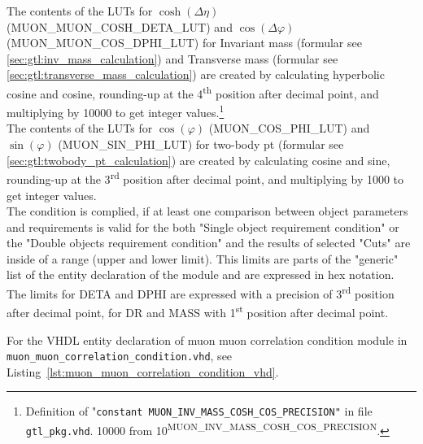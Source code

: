 The contents of the LUTs for $\cosh(\Delta\eta)$ (\small{MUON\_MUON\_COSH\_DETA\_LUT}\normalsize) and $\cos(\Delta\varphi)$ (\small{MUON\_MUON\_COS\_DPHI\_LUT}\normalsize) for Invariant mass
(formular see \ref{sec:gtl:inv_mass_calculation}) and Transverse mass (formular see \ref{sec:gtl:transverse_mass_calculation}) are created by calculating hyperbolic cosine and cosine, 
rounding-up at the 4\textsuperscript{th} position after decimal point,
and multiplying by 10000 to get integer values.\footnote{Definition of "\texttt{constant \small{MUON\_INV\_MASS\_COSH\_COS\_PRECISION}\normalsize"} in file \texttt{gtl\_pkg.vhd}.
10000 from 10\textsuperscript{\tiny{MUON\_INV\_MASS\_COSH\_COS\_PRECISION}}\normalsize.}\\
The contents of the LUTs for $\cos(\varphi)$ (\small{MUON\_COS\_PHI\_LUT}\normalsize) and $\sin(\varphi)$ (\small{MUON\_SIN\_PHI\_LUT}\normalsize) for two-body pt 
(formular see \ref{sec:gtl:twobody_pt_calculation}) are created by calculating cosine and sine, rounding-up at the 3\textsuperscript{rd} position after decimal point,
and multiplying by 1000 to get integer values.\\
The condition is complied, if at least one comparison between object parameters and requirements is valid for the both "Single object requirement condition" or the "Double objects requirement condition"
and the results of selected "Cuts" are inside of a range (upper and lower limit).
This limits are parts of the "generic" list of the entity declaration of the module and are expressed in hex notation. The limits for DETA and DPHI
are expressed with a precision of 3\textsuperscript{rd} position after decimal point, for DR and MASS with 1\textsuperscript{st} position after decimal point.

For the VHDL entity declaration of muon muon correlation condition module in \texttt{muon\_muon\_correlation\_condition.vhd}, see Listing~\ref{lst:muon_muon_correlation_condition_vhd}.\\
\clearpage


